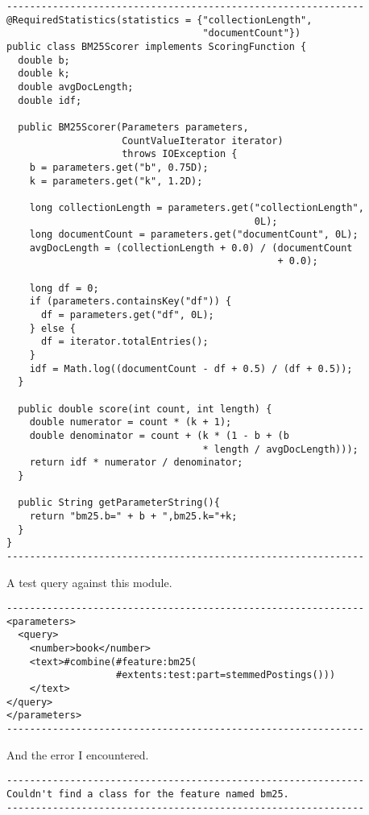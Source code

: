\documentclass[letterpaper,12pt]{article}
\begin{document}
\begin{verbatim}
--------------------------------------------------------------
@RequiredStatistics(statistics = {"collectionLength",
                                  "documentCount"})
public class BM25Scorer implements ScoringFunction {
  double b;
  double k;
  double avgDocLength;
  double idf;

  public BM25Scorer(Parameters parameters,
                    CountValueIterator iterator)
                    throws IOException {
    b = parameters.get("b", 0.75D);
    k = parameters.get("k", 1.2D);

    long collectionLength = parameters.get("collectionLength",
                                           0L);
    long documentCount = parameters.get("documentCount", 0L);
    avgDocLength = (collectionLength + 0.0) / (documentCount
                                               + 0.0);

    long df = 0;
    if (parameters.containsKey("df")) {
      df = parameters.get("df", 0L);
    } else {
      df = iterator.totalEntries();
    }
    idf = Math.log((documentCount - df + 0.5) / (df + 0.5));
  }

  public double score(int count, int length) {
    double numerator = count * (k + 1);
    double denominator = count + (k * (1 - b + (b
                                  * length / avgDocLength)));
    return idf * numerator / denominator;
  }

  public String getParameterString(){
    return "bm25.b=" + b + ",bm25.k="+k;
  }
}
--------------------------------------------------------------
\end{verbatim}

A test query against this module.

\begin{verbatim}
--------------------------------------------------------------
<parameters>
  <query>
    <number>book</number>
    <text>#combine(#feature:bm25(
                   #extents:test:part=stemmedPostings()))
    </text>
</query>
</parameters>
--------------------------------------------------------------
\end{verbatim}

And the error I encountered.

\begin{verbatim}
--------------------------------------------------------------
Couldn't find a class for the feature named bm25.
--------------------------------------------------------------
\end{verbatim}
\end{document}
